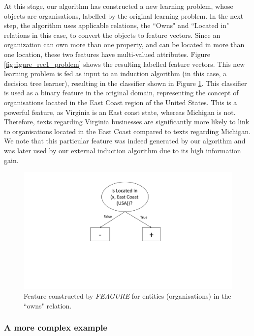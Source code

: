 \documentclass[twoside,11pt]{article}
\theoremstyle{definition}
\begin{document}
At this stage, our algorithm has constructed a new learning problem, whose objects are organisations, labelled by the original learning problem. 
In the next step, the algorithm uses applicable relations, the ``Owns" and ``Located in" relations in this case, to convert the objects to feature vectors.
Since an organization can own more than one property, and can be located in more than one location, these two features have multi-valued attributes. Figure \ref{fig:figure_rec1_problem} shows the resulting labelled feature vectors.
This new learning problem is fed as input to an induction algorithm (in this case, a decision tree learner), resulting in the classifier shown in Figure \ref{fig:feature_eastcoast_rel}. This classifier is used as a binary feature in the original domain, representing the concept of organisations located in the East Coast region of the United States.
This is a powerful feature, as Virginia is an East coast state, whereas Michigan is not. Therefore, texts regarding Virginia businesses are significantly more likely to link to organisations located in the East Coast compared to texts regarding Michigan. We note that this particular feature was indeed generated by our algorithm and was later used by our external induction algorithm due to its high information gain.

\begin{figure}[!h]
	\centering
	\includegraphics[width=0.5\linewidth]{figure_rec1_feature_new}
	\caption{Feature constructed by \emph{FEAGURE} for entities (organisations) in the ``owns" relation.}
	\label{fig:feature_eastcoast_rel}
\end{figure}

\subsubsection{A more complex example}
\end{document}
